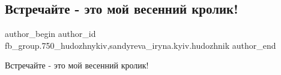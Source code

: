  
 
 
 
 

\subsection{Встречайте - это мой весенний кролик!}
\label{sec:23_03_2018.fb.fb_group.750_hudozhnykiv.1.vstrechajte_eto_moj_vesennij_krolik}
 
\ifcmt
 author_begin
   author_id fb_group.750_hudozhnykiv,sandyreva_iryna.kyiv.hudozhnik
 author_end
\fi

Встречайте - это мой весенний кролик!

